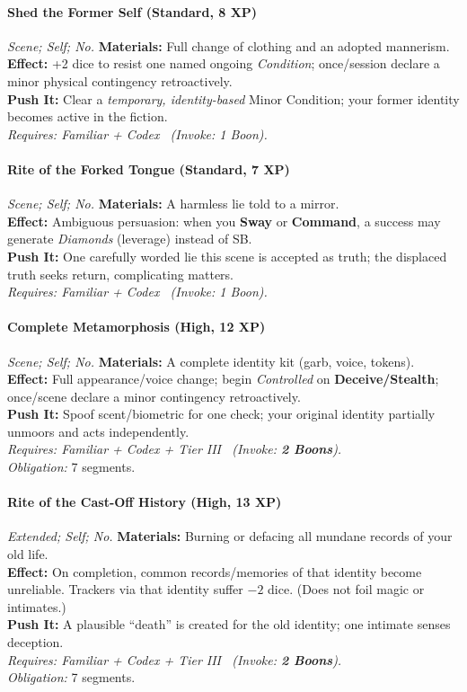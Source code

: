 \paragraph{Shed the Former Self (Standard, 8 XP)} \emph{Scene; Self; No.}
\textbf{Materials:} Full change of clothing and an adopted mannerism. \\
\textbf{Effect:} +2 dice to resist one named ongoing \emph{Condition}; once/session declare a minor physical contingency retroactively. \\
\textbf{Push It:} Clear a \emph{temporary, identity-based} Minor Condition; your former identity becomes active in the fiction. \\
\emph{Requires: Familiar + Codex \ (\textit{Invoke:} 1 Boon).}

\paragraph{Rite of the Forked Tongue (Standard, 7 XP)} \emph{Scene; Self; No.}
\textbf{Materials:} A harmless lie told to a mirror. \\
\textbf{Effect:} Ambiguous persuasion: when you \textbf{Sway} or \textbf{Command}, a success may generate \emph{Diamonds} (leverage) instead of SB. \\
\textbf{Push It:} One carefully worded lie this scene is accepted as truth; the displaced truth seeks return, complicating matters. \\
\emph{Requires: Familiar + Codex \ (\textit{Invoke:} 1 Boon).}

\paragraph{Complete Metamorphosis (High, 12 XP)} \emph{Scene; Self; No.}
\textbf{Materials:} A complete identity kit (garb, voice, tokens). \\
\textbf{Effect:} Full appearance/voice change; begin \emph{Controlled} on \textbf{Deceive/Stealth}; once/scene declare a minor contingency retroactively. \\
\textbf{Push It:} Spoof scent/biometric for one check; your original identity partially unmoors and acts independently. \\
\emph{Requires: Familiar + Codex + Tier III \ (\textit{Invoke:} \textbf{2 Boons}).} \\
\emph{Obligation:} 7 segments.

\paragraph{Rite of the Cast-Off History (High, 13 XP)} \emph{Extended; Self; No.}
\textbf{Materials:} Burning or defacing all mundane records of your old life. \\
\textbf{Effect:} On completion, common records/memories of that identity become unreliable. Trackers via that identity suffer $-2$ dice. (Does not foil magic or intimates.) \\
\textbf{Push It:} A plausible “death” is created for the old identity; one intimate senses deception. \\
\emph{Requires: Familiar + Codex + Tier III \ (\textit{Invoke:} \textbf{2 Boons}).} \\
\emph{Obligation:} 7 segments.
